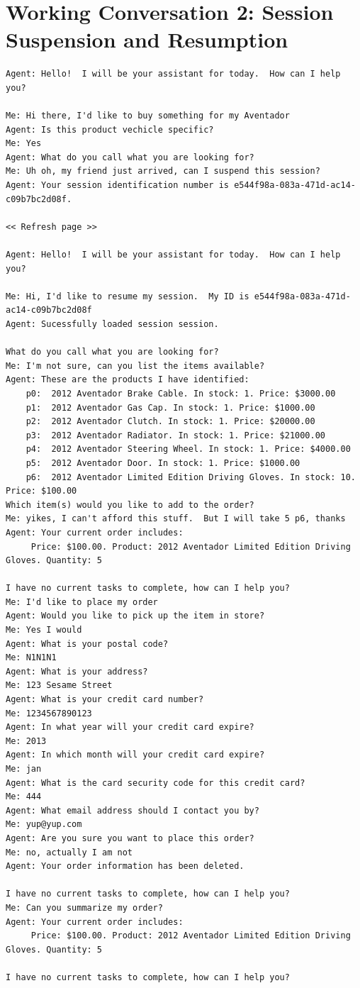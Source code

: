\documentclass[11pt, titlepage]{article}
\begin{document}
\section{Working Conversation 2: Session Suspension and Resumption}
\begin{lstlisting}
Agent: Hello!  I will be your assistant for today.  How can I help you?

Me: Hi there, I'd like to buy something for my Aventador
Agent: Is this product vechicle specific?
Me: Yes
Agent: What do you call what you are looking for?
Me: Uh oh, my friend just arrived, can I suspend this session?
Agent: Your session identification number is e544f98a-083a-471d-ac14-c09b7bc2d08f.

<< Refresh page >>

Agent: Hello!  I will be your assistant for today.  How can I help you?

Me: Hi, I'd like to resume my session.  My ID is e544f98a-083a-471d-ac14-c09b7bc2d08f
Agent: Sucessfully loaded session session.

What do you call what you are looking for?
Me: I'm not sure, can you list the items available?
Agent: These are the products I have identified:
	p0:	 2012 Aventador Brake Cable. In stock: 1. Price: $3000.00
	p1:	 2012 Aventador Gas Cap. In stock: 1. Price: $1000.00
	p2:	 2012 Aventador Clutch. In stock: 1. Price: $20000.00
	p3:	 2012 Aventador Radiator. In stock: 1. Price: $21000.00
	p4:	 2012 Aventador Steering Wheel. In stock: 1. Price: $4000.00
	p5:	 2012 Aventador Door. In stock: 1. Price: $1000.00
	p6:	 2012 Aventador Limited Edition Driving Gloves. In stock: 10. Price: $100.00
Which item(s) would you like to add to the order?
Me: yikes, I can't afford this stuff.  But I will take 5 p6, thanks
Agent: Your current order includes:
	 Price: $100.00. Product: 2012 Aventador Limited Edition Driving Gloves. Quantity: 5

I have no current tasks to complete, how can I help you?
Me: I'd like to place my order
Agent: Would you like to pick up the item in store?
Me: Yes I would
Agent: What is your postal code?
Me: N1N1N1
Agent: What is your address?
Me: 123 Sesame Street
Agent: What is your credit card number?
Me: 1234567890123
Agent: In what year will your credit card expire?
Me: 2013
Agent: In which month will your credit card expire?
Me: jan
Agent: What is the card security code for this credit card?
Me: 444
Agent: What email address should I contact you by?
Me: yup@yup.com
Agent: Are you sure you want to place this order?
Me: no, actually I am not
Agent: Your order information has been deleted.

I have no current tasks to complete, how can I help you?
Me: Can you summarize my order?
Agent: Your current order includes:
	 Price: $100.00. Product: 2012 Aventador Limited Edition Driving Gloves. Quantity: 5

I have no current tasks to complete, how can I help you?
\end{lstlisting}
\end{document}
